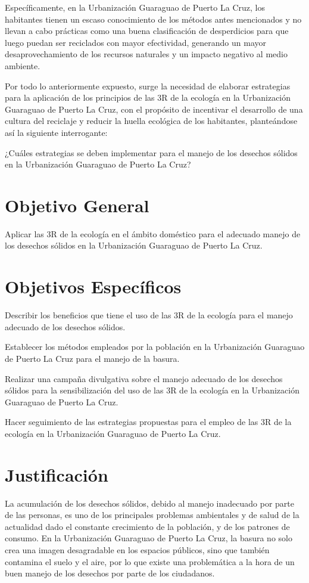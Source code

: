 Específicamente, en la Urbanización Guaraguao de Puerto La Cruz, los habitantes tienen un escaso conocimiento de los métodos antes mencionados y no llevan a cabo prácticas como una buena clasificación de desperdicios para que luego puedan ser reciclados con mayor efectividad, generando un mayor desaprovechamiento de los recursos naturales y un impacto negativo al medio ambiente. 

Por todo lo anteriormente expuesto, surge la necesidad de elaborar estrategias para la aplicación de los principios de las 3R de la ecología en la Urbanización Guaraguao de Puerto La Cruz, con el propósito de incentivar el desarrollo de una cultura del reciclaje y reducir la huella ecológica de los habitantes, planteándose así la siguiente interrogante:

¿Cuáles estrategias se deben implementar para el manejo de los desechos sólidos en la Urbanización Guaraguao de Puerto La Cruz?

\newpage

{\setlength{\parskip}{0cm}
\section{Objetivo General}

Aplicar las 3R de la ecología en el ámbito doméstico para el adecuado manejo de los desechos sólidos en la Urbanización Guaraguao de Puerto La Cruz.
}

{\setlength{\parskip}{0cm}
\section{Objetivos Específicos}

Describir los beneficios que tiene el uso de las 3R de la ecología para el manejo adecuado de los desechos sólidos.
}

Establecer los métodos empleados por la población en la Urbanización Guaraguao de Puerto La Cruz para el manejo de la basura.

Realizar una campaña divulgativa sobre el manejo adecuado de los desechos sólidos para la sensibilización del uso de las 3R de la ecología en la Urbanización Guaraguao de Puerto La Cruz.

Hacer seguimiento de las estrategias propuestas para el empleo de las 3R de la ecología en la Urbanización Guaraguao de Puerto La Cruz.

\newpage

{\setlength{\parskip}{0cm}
\section{Justificación}

La acumulación de los desechos sólidos, debido al manejo inadecuado por parte de las personas, es uno de los principales problemas ambientales y de salud de la actualidad dado el constante crecimiento de la población, y de los patrones de consumo. En la Urbanización Guaraguao de Puerto La Cruz, la basura no solo crea una imagen desagradable en los espacios públicos, sino que también contamina el suelo y el aire, por lo que existe una problemática a la hora de un buen manejo de los desechos por parte de los ciudadanos. 
}

